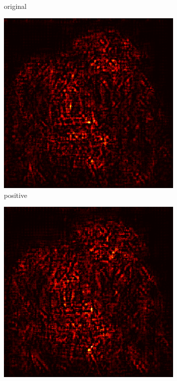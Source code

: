 \documentclass[preprint,12pt]{elsarticle}
\begin{document}
\begin{figure}
\begin{subfigure}{0.14\linewidth}
        \caption{original}
    \end{subfigure}
    \hfill
    \begin{subfigure}{0.14\textwidth}
        \centering
        \includegraphics[width=\linewidth]{../visualizations/examples/imagenette/resnet18/positive_saliency_map/8.png}
        \caption{positive}
    \end{subfigure}
    \hfill
    \begin{subfigure}{0.14\textwidth}
        \centering
        \includegraphics[width=\linewidth]{../visualizations/examples/imagenette/resnet18/negative_saliency_map/8.png}

\end{subfigure}
\end{figure}
\end{document}
